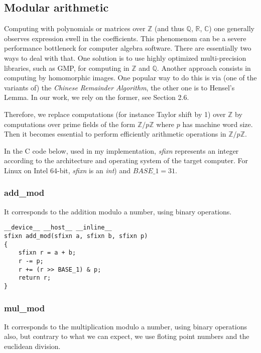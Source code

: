 \newtheorem*{crt1}{Chinese Remainder theorem $1^{st}$ version (CRT1)}
\newtheorem*{crt2}{Chinese Remainder theorem $2^{nd}$ version (CRT2)}

\subsection{Modular arithmetic}

Computing with polynomials or matrices over $\mathbb{Z}$ (and thus  $\mathbb{Q}$,
$\mathbb{R}$, $\mathbb{C}$) one generally observes expression swell in the
coefficients.
This phenomenom can be a severe performance bottleneck for computer algebra
software. 
There are essentially two ways to deal with that.
One solution is to use highly optimized multi-precision libraries, such as GMP, 
for computing in  $\mathbb{Z}$ and $\mathbb{Q}$.
Another approach consists in computing by homomorphic images.
One popular way to do this is via (one of the variants of) 
the {\em Chinese Remainder Algorithm}, the other one is to
Hensel's Lemma.
In our work, we rely on the former, see Section 2.6.

Therefore, we replace computations (for instance Taylor shift by 1) 
over $\mathbb{Z}$ by computations over prime fields
of the form $\mathbb{Z}/p{\mathbb{Z}}$ where $p$ has machine word size.
Then it becomes essential to perform efficiently 
arithmetic operations in  $\mathbb{Z}/p{\mathbb{Z}}$.

In the C code below, used in my implementation, \textit{sfixn} represents an integer according to the architecture and operating system of the target computer. 
For Linux on Intel 64-bit, \textit{sfixn} is an \textit{int}) and $BASE\_1 = 31$.

\subsubsection*{add\_mod}
It corresponds to the addition modulo a number, using binary operations.

\begin{verbatim}
__device__ __host__ __inline__ 
sfixn add_mod(sfixn a, sfixn b, sfixn p)
{
    sfixn r = a + b;
    r -= p;
    r += (r >> BASE_1) & p;
    return r;
}
\end{verbatim}

\subsubsection*{mul\_mod}
It corresponds to the multiplication modulo a number, using binary operations also, but contrary to what we can expect, we use floting point numbers and the euclidean division.

